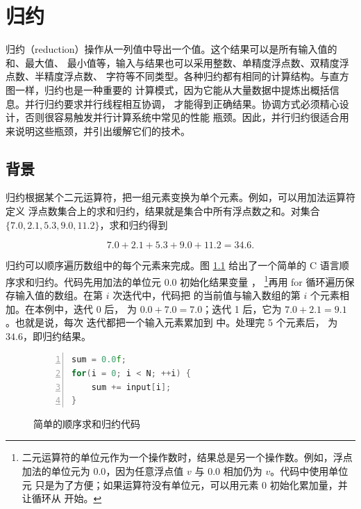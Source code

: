 \chapter{归约}
\label{chap:reduction}
\chaptercontents

\setcounter{footnote}{0}

归约（reduction）操作从一列值中导出一个值。这个结果可以是所有输入值的和、最大值、
最小值等，输入与结果也可以采用整数、单精度浮点数、双精度浮点数、半精度浮点数、
字符等不同类型。各种归约都有相同的计算结构。与直方图一样，归约也是一种重要的
计算模式，因为它能从大量数据中提炼出概括信息。并行归约要求并行线程相互协调，
才能得到正确结果。协调方式必须精心设计，否则很容易触发并行计算系统中常见的性能
瓶颈。因此，并行归约很适合用来说明这些瓶颈，并引出缓解它们的技术。

\section{背景}
\label{sec:reduction-background}

归约根据某个二元运算符，把一组元素变换为单个元素。例如，可以用加法运算符定义
浮点数集合上的求和归约，结果就是集合中所有浮点数之和。对集合
$\{7.0,2.1,5.3,9.0,11.2\}$，求和归约得到

\[
  7.0+2.1+5.3+9.0+11.2=34.6.
\]

归约可以顺序遍历数组中的每个元素来完成。图 \ref{fig:10-1} 给出了一个简单的 C
语言顺序求和归约。代码先用加法的单位元 $0.0$ 初始化结果变量 ，
\footnote{二元运算符的单位元作为一个操作数时，结果总是另一个操作数。例如，浮点
加法的单位元为 $0.0$，因为任意浮点值 $v$ 与 $0.0$ 相加仍为 $v$。代码中使用单位元
只是为了方便；如果运算符没有单位元，可以用元素 0 初始化累加量，并让循环从
 开始。}再用 for 循环遍历保存输入值的数组。在第 $i$ 次迭代中，代码把
 的当前值与输入数组的第 $i$ 个元素相加。在本例中，迭代 0 后，
 为 $0.0+7.0=7.0$；迭代 1 后，它为 $7.0+2.1=9.1$。也就是说，每次
迭代都把一个输入元素累加到  中。处理完 5 个元素后， 为
$34.6$，即归约结果。

\begin{figure}[htbp]
  \centering
  \begin{minipage}{0.88\textwidth}
  \begin{lstlisting}[language=C++,numbers=left]
sum = 0.0f;
for(i = 0; i < N; ++i) {
    sum += input[i];
}
  \end{lstlisting}
  \end{minipage}
  \caption{简单的顺序求和归约代码}
  \label{fig:10-1}
\end{figure}

